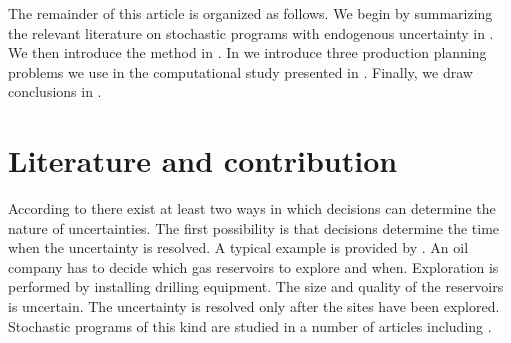 \documentclass[12pt]{article}
\theoremstyle{thmstylethree}%
\begin{document}
The remainder of this article is organized as follows. We begin by summarizing the relevant literature on stochastic programs with endogenous uncertainty in . We then introduce the method in . In  we introduce three production planning problems we use in the computational study presented in . Finally, we draw conclusions in .

\section{Literature and contribution}
\label{sec:literature}
According to \cite{GoeG06} there exist at least two ways in which decisions can determine the nature of uncertainties.
The first possibility is that decisions determine the time when the uncertainty is resolved. 
A typical example is provided by \cite{ApaG16}. An oil company has to decide which gas reservoirs to explore and when. Exploration is performed by installing drilling equipment. The size and quality of the reservoirs is uncertain. The uncertainty is resolved only after the sites have been explored. 
Stochastic programs of this kind are studied in a number of articles including \cite{ColM08,TarG08,TarGG09,ColM10,GupG11,MerV11,TarGG13,ApaG16}. 
\end{document}

